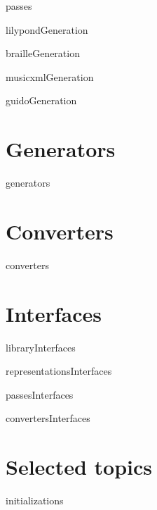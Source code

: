 \documentclass[11pt,a4paper]{report}
\begin{document}
{passes}

{lilypondGeneration}

{brailleGeneration}

{musicxmlGeneration}

{guidoGeneration}


\part{Generators}

{generators}


\part{Converters}

{converters}


\part{Interfaces}

{libraryInterfaces}

{representationsInterfaces}

{passesInterfaces}

{convertersInterfaces}


\part{Selected topics}


{initializations}


\end{document}
